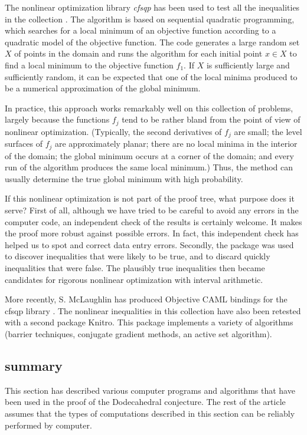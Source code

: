 \documentclass{article} %
\begin{document}
The nonlinear optimization library {\it cfsqp} has been used to
test all the inequalities in the collection \cite{cfsqp}.  
The algorithm
is based on sequential quadratic programming, which
searches for a local minimum of an objective function
according to a quadratic model of the objective
function.  The code generates a large random set $X$ of points in the
domain and runs the algorithm for each initial point $x\in X$ to
find a local minimum to the objective function $f_1$.  If $X$
is sufficiently large and sufficiently random, it can
be expected that one
of the local minima produced to be a numerical approximation
of the  global minimum.

In practice, this approach works remarkably well on this
collection of problems, largely because the functions $f_j$
tend to be rather bland from the point of view of nonlinear
optimization.  (Typically, the second derivatives of $f_j$
are small; the level surfaces of $f_j$ are approximately planar;
there are no local minima in the interior of the domain;
the global minimum occurs at a corner of the domain; and
every run of the algorithm produces the same local minimum.)
Thus, the method can usually determine the true global minimum with
high probability.


If this nonlinear optimization is not part of the proof tree,
what purpose does it serve? First of all, although we have
tried to be careful to avoid any errors in the computer code,
an independent check of the results is certainly welcome.
It makes the proof more robust against possible errors.  
In fact,
this independent check has helped us to spot and correct 
 data entry errors.  Secondly, the package was used to discover
inequalities that were likely to be true, and to discard quickly
inequalities that were false.  The plausibly true inequalities
then became candidates for  rigorous nonlinear optimization
with interval arithmetic.

More recently, 
S. McLaughlin has produced Objective CAML bindings for the
cfsqp library \cite{McLp}.  The nonlinear inequalities in this
collection have also been retested with a second package
Knitro.  This package implements a variety of algorithms
(barrier techniques, conjugate gradient methods, an active set algorithm).


\subsection{summary}

This section has described various computer programs 
and algorithms that
have been used in the proof of the Dodecahedral conjecture.
The rest of the article assumes that the types of
computations described in this section can be reliably performed
by computer.
\end{document}
